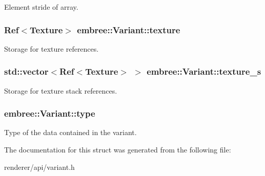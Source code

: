 Element stride of array. 

\hypertarget{structembree_1_1_variant_a75c8a7960d7bd076d7944f459587083b}{
\subsubsection[{texture}]{\setlength{\rightskip}{0pt plus 5cm}Ref$<${\bf Texture}$>$ {\bf embree::Variant::texture}}}
\label{structembree_1_1_variant_a75c8a7960d7bd076d7944f459587083b}


Storage for texture references. 

\hypertarget{structembree_1_1_variant_ae8005313e7fc97c4a39d57e1e84f459b}{
\subsubsection[{texture\_\-s}]{\setlength{\rightskip}{0pt plus 5cm}std::vector$<$Ref$<${\bf Texture}$>$ $>$ {\bf embree::Variant::texture\_\-s}}}
\label{structembree_1_1_variant_ae8005313e7fc97c4a39d57e1e84f459b}


Storage for texture stack references. 

\hypertarget{structembree_1_1_variant_a23d594de4575ead4ffdbb2e0bfef522c}{
\subsubsection[{type}]{ {\bf embree::Variant::type}}}
\label{structembree_1_1_variant_a23d594de4575ead4ffdbb2e0bfef522c}


Type of the data contained in the variant. 



The documentation for this struct was generated from the following file:\begin{DoxyCompactItemize}
\item 
renderer/api/variant.h\end{DoxyCompactItemize}
